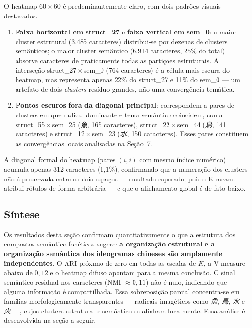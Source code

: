 \documentclass[10pt, a4paper, titlepage]{extarticle}
\begin{document}
O heatmap $60 \times 60$ é predominantemente claro, com dois padrões
visuais destacados:

\begin{enumerate}
    \item \textbf{Faixa horizontal em struct\_27} e \textbf{faixa vertical
    em sem\_0}: o maior cluster estrutural (3.485 caracteres) distribui-se
    por dezenas de clusters semânticos; o maior cluster semântico (6.914
    caracteres, 25\% do total) absorve caracteres de praticamente todas as
    partições estruturais. A interseção struct\_27\,$\times$\,sem\_0
    (764 caracteres) é a célula mais escura do heatmap, mas representa
    apenas 22\% do struct\_27 e 11\% do sem\_0 --- um artefato de dois
    \emph{clusters}-resíduo grandes, não uma convergência temática.
    \item \textbf{Pontos escuros fora da diagonal principal}: correspondem
    a pares de clusters em que radical dominante e tema semântico coincidem,
    como struct\_55\,$\times$\,sem\_25 (\textit{魚}, 165 caracteres),
    struct\_22\,$\times$\,sem\_44 (\textit{鳥}, 141 caracteres) e
    struct\_12\,$\times$\,sem\_23 (\textit{水}, 150 caracteres). Esses
    pares constituem as convergências locais analisadas na Seção~7.
\end{enumerate}

A diagonal formal do heatmap (pares $(i,i)$ com mesmo índice numérico)
acumula apenas 312 caracteres (1,1\%), confirmando que a numeração dos clusters não é preservada entre os dois espaços --- resultado
esperado, pois o K-means atribui rótulos de forma arbitrária --- e que o
alinhamento global é de fato baixo.

\subsection{Síntese}
Os resultados desta seção confirmam quantitativamente o que a estrutura dos
compostos semântico-fonéticos sugere: \textbf{a organização estrutural e a
organização semântica dos ideogramas chineses são amplamente independentes}.
O ARI próximo de zero em todas as escalas de $K$, a V-measure abaixo de
$0{,}12$ e o heatmap difuso apontam para a mesma conclusão.
O sinal semântico residual nos caracteres (NMI $\approx 0{,}11$) não é
nulo, indicando que alguma informação é compartilhada. Essa sobreposição
parcial concentra-se em famílias morfologicamente transparentes --- radicais
imagéticos como \textit{魚}, \textit{鳥}, \textit{水} e \textit{火} ---,
cujos clusters estrutural e semântico se alinham localmente. Essa análise
é desenvolvida na seção a seguir.
\end{document}
